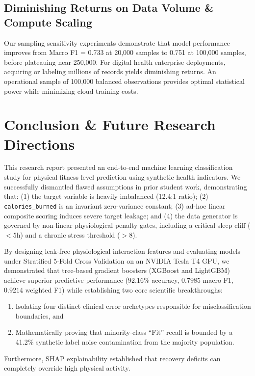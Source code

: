 \documentclass[11pt,a4paper]{article}
\begin{document}
\subsection{Diminishing Returns on Data Volume \& Compute Scaling}
Our sampling sensitivity experiments demonstrate that model performance improves from Macro F1 = 0.733 at 20,000 samples to 0.751 at 100,000 samples, before plateauing near 250,000. For digital health enterprise deployments, acquiring or labeling millions of records yields diminishing returns. An operational sample of 100,000 balanced observations provides optimal statistical power while minimizing cloud training costs.

\section{Conclusion \& Future Research Directions}
This research report presented an end-to-end machine learning classification study for physical fitness level prediction using synthetic health indicators. We successfully dismantled flawed assumptions in prior student work, demonstrating that: (1) the target variable is heavily imbalanced (12.4:1 ratio); (2) \texttt{calories\_burned} is an invariant zero-variance constant; (3) ad-hoc linear composite scoring induces severe target leakage; and (4) the data generator is governed by non-linear physiological penalty gates, including a critical sleep cliff ($<5$h) and a chronic stress threshold ($>8$).

By designing leak-free physiological interaction features and evaluating models under Stratified 5-Fold Cross Validation on an NVIDIA Tesla T4 GPU, we demonstrated that tree-based gradient boosters (XGBoost and LightGBM) achieve superior predictive performance ($\mathbf{92.16\%}$ accuracy, $\mathbf{0.7985}$ macro F1, $\mathbf{0.9214}$ weighted F1) while establishing two core scientific breakthroughs:
\begin{enumerate}[leftmargin=*,itemsep=1pt]
    \item Isolating four distinct clinical error archetypes responsible for misclassification boundaries, and
    \item Mathematically proving that minority-class ``Fit'' recall is bounded by a 41.2\% synthetic label noise contamination from the majority population.
\end{enumerate}
Furthermore, SHAP explainability established that recovery deficits can completely override high physical activity.
\end{document}
